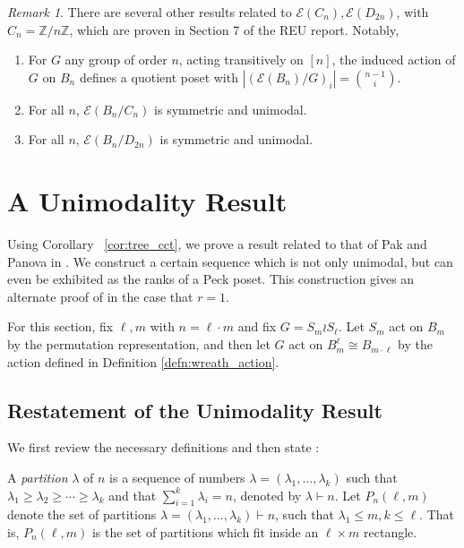 \documentclass[smallextended, envcountsame, numbook]{svjour3}
\theoremstyle{plain}
\theoremstyle{definition}
\theoremstyle{remark}
\newtheorem{rmk}[thm]{Remark}
\numberwithin{equation}{section}
\newcommand\ssec{\subsection}
\begin{document}
\begin{rmk}
There are several other results related to $\mathcal E(C_n),\mathcal E(D_{2n})$, with $C_n = \mathbb Z/n\mathbb Z$, which are proven in Section 7 of the REU report. Notably,
\begin{enumerate}
	\item For $G$ any group of order $n$, acting transitively on $[n]$, the induced action of $G$ on $B_n$ defines a quotient poset with $|(\mathcal E(B_n)/G)_i| = \binom {n-1} i$.
	\item For all $n$, $\mathcal E(B_n/C_n)$ is symmetric and unimodal.
	\item For all $n$, $\mathcal E(B_n/D_{2n})$ is symmetric and unimodal.
\end{enumerate}
\end{rmk}



\section{A Unimodality Result}\label{sec:wreath_product}

Using Corollary ~\ref{cor:tree_cct}, we prove a result related to that of Pak and Panova in \cite[Theorem 1.1]{pak}. We construct a certain sequence which is not only unimodal, but can even be exhibited as the ranks of a Peck poset. This construction gives an alternate proof of \cite[Theorem 1.1]{pak} in the case that $r = 1$.

For this section, fix $\ell,m$ with $n = \ell \cdot m$ and fix $G = S_m \wr S_\ell$. Let $S_m$ act on $B_m$ by the permutation representation, and then let $G$ act on $B_{m}^\ell\cong B_{m \cdot \ell}$ by the action defined in Definition \ref{defn:wreath_action}.

\ssec{Restatement of the Unimodality Result}
We first review the necessary definitions and then state \cite[Theorem 1.1]{pak}:

A {\it partition} $\lambda$ of $n$ is a sequence of numbers $\lambda = (\lambda_1,\ldots, \lambda_k)$ such that $\lambda_1 \geq \lambda_2 \geq \cdots \geq \lambda_k$ and that $\sum_{i=1}^k \lambda_i = n$, denoted by  $\lambda \vdash n$. Let $P_n(\ell,m)$ denote the set of partitions $\lambda = (\lambda_1,\ldots, \lambda_k) \vdash n$, such that $\lambda_1 \leq m,k \leq \ell$. That is, $P_n(\ell,m)$ is the set of partitions which fit inside an $\ell \times m$ rectangle.
\end{document}
